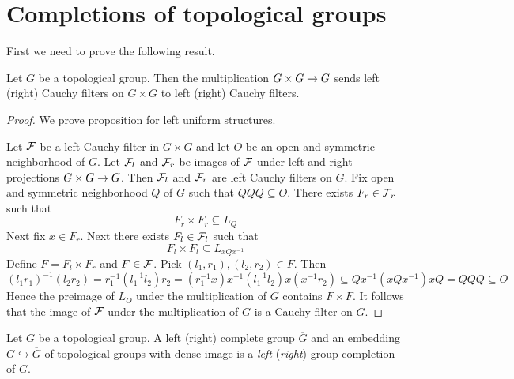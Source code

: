 \documentclass[10pt]{amsart}
\begin{document}
\section{Completions of topological groups}
\noindent
First we need to prove the following result.

\begin{proposition}\label{proposition:multiplication_preserves_one_sided_Cauchy_filters}
	Let $G$ be a topological group. Then the multiplication $G\times G\rightarrow G$ sends left (right) Cauchy filters on $G\times G$ to left (right) Cauchy filters.
\end{proposition}
\begin{proof}
	We prove proposition for left uniform structures.

	Let ${\mathcal F}$ be a left Cauchy filter in $G\times G$ and let $O$ be an open and symmetric neighborhood of $G$. Let ${\mathcal F}_l$ and ${\mathcal F}_r$ be images of ${\mathcal F}$ under left and right projections $G\times G\rightarrow G$. Then ${\mathcal F}_l$ and ${\mathcal F}_r$ are left Cauchy filters on $G$. Fix open and symmetric neighborhood $Q$ of $G$ such that $QQQ \subseteq O$. There exists $F_r \in {\mathcal F}_r$ such that
	$$F_r \times F_r \subseteq L_Q$$
	Next fix $x \in F_r$. Next there exists $F_l \in {\mathcal F}_l$ such that
	$$F_l\times F_l \subseteq L_{xQx^{-1}}$$
	Define $F = F_l\times F_r$ and $F \in {\mathcal F}$. Pick $(l_1,r_1),(l_2,r_2) \in F$. Then
	$$(l_1r_1)^{-1}(l_2r_2) = r_1^{-1}(l_1^{-1}l_2)r_2 = (r_1^{-1}x)x^{-1}(l_1^{-1}l_2)x(x^{-1}r_2) \subseteq Qx^{-1}\left(xQx^{-1}\right)xQ = QQQ \subseteq O$$
	Hence the preimage of $L_O$ under the multiplication of $G$ contains $F \times F$. It follows that the image of ${\mathcal F}$ under the multiplication of $G$ is a Cauchy filter on $G$.
\end{proof}

\begin{definition}
	Let $G$ be a topological group. A left (right) complete group $\overline{G}$ and an embedding $G \hookrightarrow \overline{G}$ of topological groups with dense image is a \textit{left} (\textit{right}) group completion of $G$.
\end{definition}
\end{document}
